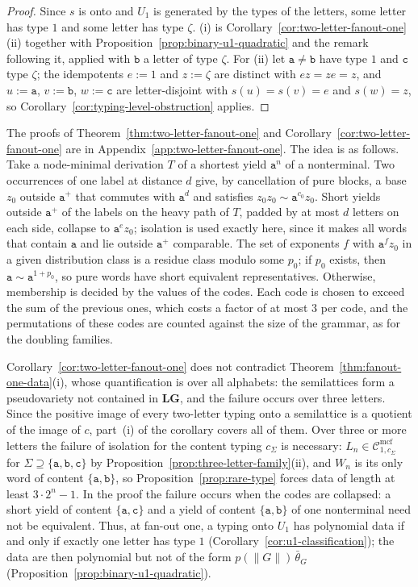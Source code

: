 \documentclass[11pt]{article}
\numberwithin{equation}{section}
\theoremstyle{plain}
\theoremstyle{definition}
\theoremstyle{remark}
\newcommand{\Cmcf}[2]{\mathcal{C}^{\mathrm{mcf}}_{#1,#2}}
\theoremstyle{plain}
\begin{document}
\begin{proof}
Since $s$ is onto and $U_1$ is generated by the types of the letters, some letter
has type $1$ and some letter has type $\zeta$.  (i) is
Corollary~\ref{cor:two-letter-fanout-one}(ii) together with
Proposition~\ref{prop:binary-u1-quadratic} and the remark following it, applied
with $\mathtt b$ a letter of type $\zeta$.  For (ii) let $\mathtt a\ne\mathtt b$ have
type $1$ and $\mathtt c$ type $\zeta$; the idempotents $e:=1$ and $z:=\zeta$ are
distinct with $ez=ze=z$, and $u:=\mathtt a$, $v:=\mathtt b$, $w:=\mathtt c$ are
letter-disjoint with $s(u)=s(v)=e$ and $s(w)=z$, so
Corollary~\ref{cor:typing-level-obstruction} applies.
\end{proof}

The proofs of Theorem~\ref{thm:two-letter-fanout-one} and
Corollary~\ref{cor:two-letter-fanout-one} are in
Appendix~\ref{app:two-letter-fanout-one}.  The idea is as follows.  Take a
node-minimal derivation $T$ of a shortest yield $\mathtt a^n$ of a nonterminal.
Two occurrences of one label at distance $d$ give, by cancellation of pure
blocks, a base $z_0$ outside $\mathtt a^+$ that commutes with $\mathtt a^d$ and
satisfies $z_0z_0\sim\mathtt a^{c_0}z_0$.  Short yields outside $\mathtt a^+$ of the
labels on the heavy path of $T$, padded by at most $d$ letters on each side,
collapse to $\mathtt a^ez_0$; isolation is used exactly here, since it makes all
words that contain $\mathtt a$ and lie outside $\mathtt a^+$ comparable.  The
set of exponents $f$ with $\mathtt a^fz_0$ in a given distribution class is a
residue class modulo some $p_0$; if $p_0$ exists, then $\mathtt a\sim\mathtt
a^{1+p_0}$, so pure words have short equivalent representatives.  Otherwise,
membership is decided by the values of the codes.  Each code is chosen to exceed
the sum of the previous ones, which costs a factor of at most $3$ per code, and
the permutations of these codes are counted against the size of the grammar,
as for the doubling families.

Corollary~\ref{cor:two-letter-fanout-one} does not contradict
Theorem~\ref{thm:fanout-one-data}(i), whose quantification is over all
alphabets: the semilattices form a pseudovariety not contained in
$\mathbf{LG}$, and the failure occurs over three letters.  Since the positive
image of every two-letter typing onto a semilattice is a quotient of the image
of $c$, part~(i) of the corollary covers all of them.  Over three or more
letters the failure of isolation for the content typing $c_\Sigma$ is
necessary: $L_n\in\Cmcf{1}{c_\Sigma}$ for $\Sigma\supseteq\{\mathtt a,\mathtt b,\mathtt
c\}$ by Proposition~\ref{prop:three-letter-family}(ii), and $W_n$ is its only word
of content $\{\mathtt a,\mathtt b\}$, so Proposition~\ref{prop:rare-type} forces data
of length at least $3\cdot2^n-1$.  In the proof the failure occurs when the codes
are collapsed: a short yield of content $\{\mathtt a,\mathtt c\}$ and a yield of
content $\{\mathtt a,\mathtt b\}$ of one nonterminal need not be equivalent.
Thus, at fan-out one, a typing onto $U_1$ has polynomial data if and only if
exactly one letter has type $1$ (Corollary~\ref{cor:u1-classification}); the data
are then polynomial but not of the form $p(\|G\|)\,\bar\theta_G$
(Proposition~\ref{prop:binary-u1-quadratic}).
\end{document}
